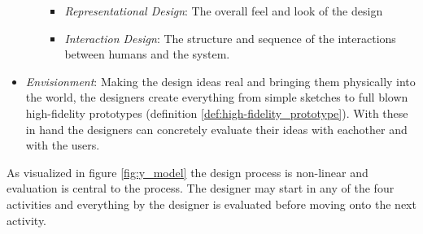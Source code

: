 \begin{itemize}
\begin{itemize}
\begin{itemize}
    \item \emph{Representational Design}: 
      The overall feel and look of the design
      
    \item \emph{Interaction Design}: 
      The structure and sequence of the interactions between humans and the system.
      
    \end{itemize}
  \end{itemize}

\item \emph{Envisionment}: 
  Making the design ideas real and bringing them physically into the world, the designers create everything from simple sketches to full blown high-fidelity prototypes (definition \ref{def:high-fidelity_prototype}). With these in hand the designers can concretely evaluate their ideas with eachother and with the users.
  
\end{itemize}
As visualized in figure \ref{fig:y_model} the design process is non-linear and evaluation is central to the process. The designer may start in any of the four activities and everything by the designer is evaluated before moving onto the next activity. \cite[p. 49-54, 188, 206]{benyon_14}


